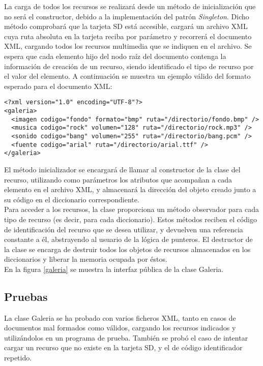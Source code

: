 La carga de todos los recursos se realizará desde un método de inicialización que no será el constructor, debido a la implementación del patrón \emph{Singleton}. Dicho método comprobará que la tarjeta SD está accesible, cargará un archivo XML cuya ruta absoluta en la tarjeta reciba por parámetro y recorrerá el documento XML, cargando todos los recursos multimedia que se indiquen en el archivo. Se espera que cada elemento hijo del nodo raíz del documento contenga la información de creación de un recurso, siendo identificado el tipo de recurso por el valor del elemento. A continuación se muestra un ejemplo válido del formato esperado para el documento XML:

\begin{lstlisting}[style=XML]
<?xml version="1.0" encoding="UTF-8"?>
<galeria>
  <imagen codigo="fondo" formato="bmp" ruta="/directorio/fondo.bmp" />
  <musica codigo="rock" volumen="128" ruta="/directorio/rock.mp3" />
  <sonido codigo="bang" volumen="255" ruta="/directorio/bang.pcm" />
  <fuente codigo="arial" ruta="/directorio/arial.ttf" />
</galeria>
\end{lstlisting}

El método inicializador se encargará de llamar al constructor de la clase del recurso, utilizando como parámetros los atributos que acompañan a cada elemento en el archivo XML, y almacenará la dirección del objeto creado junto a su código en el diccionario correspondiente.\\

Para acceder a los recursos, la clase proporciona un método observador para cada tipo de recurso (es decir, para cada diccionario). Estos métodos reciben el código de identificación del recurso que se desea utilizar, y devuelven una referencia constante a él, abstrayendo al usuario de la lógica de punteros. El destructor de la clase se encarga de destruir todos los objetos de recursos almacenados en los diccionarios y liberar la memoria ocupada por éstos.\\

En la figura \ref{galeria} se muestra la interfaz pública de la clase Galeria.\\


\subsection{Pruebas}

La clase Galeria se ha probado con varios ficheros XML, tanto en casos de documentos mal formados como válidos, cargando los recursos indicados y utilizándolos en un programa de prueba. También se probó el caso de intentar cargar un recurso que no existe en la tarjeta SD, y el de código identificador repetido.

